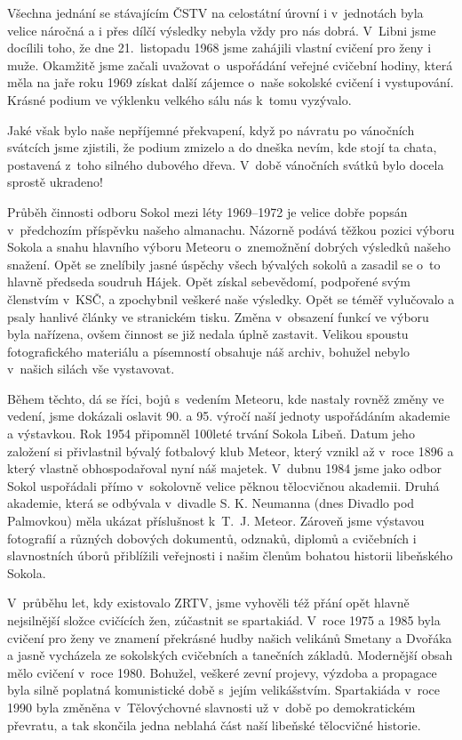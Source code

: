 \documentclass[a5paper, 11pt, twoside]{article}
\begin{document}
Všechna jednání se stávajícím ČSTV na celostátní úrovní i v~jednotách
byla velice náročná a i přes dílčí výsledky nebyla vždy pro nás dobrá.
V~Libni jsme docílili toho, že dne 21.~listopadu 1968 jsme zahájili
vlastní cvičení pro ženy i muže. Okamžitě jsme začali uvažovat
o~uspořádání veřejné cvičební hodiny, která měla na jaře roku 1969 získat
další zájemce o~naše sokolské cvičení i vystupování. Krásné podium ve
výklenku velkého sálu nás k~tomu vyzývalo.

Jaké však bylo naše nepříjemné překvapení, když po návratu po vánočních
svátcích jsme zjistili, že podium zmizelo a do dneška nevím, kde stojí
ta chata, postavená z~toho silného dubového dřeva. V~době vánočních
svátků bylo docela sprostě ukradeno!

Průběh činnosti odboru Sokol mezi léty 1969--1972 je velice
dobře popsán v~předchozím příspěvku našeho almanachu. Názorně podává
těžkou pozici výboru Sokola a snahu hlavního výboru Meteoru o~znemožnění
dobrých výsledků našeho snažení. Opět se znelíbily jasné úspěchy všech
bývalých sokolů a zasadil se o~to hlavně předseda soudruh Hájek. Opět
získal sebevědomí, podpořené svým členstvím v~KSČ, a zpochybnil veškeré
naše výsledky. Opět se téměř vylučovalo a psaly hanlivé články ve
stranickém tisku. Změna v~obsazení funkcí ve výboru byla nařízena, ovšem
činnost se již nedala úplně zastavit. Velikou spoustu fotografického
materiálu a písemností obsahuje náš archiv, bohužel nebylo v~našich
silách vše vystavovat.

Během těchto, dá se říci, bojů s~vedením Meteoru, kde nastaly rovněž
změny ve vedení, jsme dokázali oslavit 90. a 95. výročí naší jednoty
uspořádáním akademie a výstavkou. Rok 1954 připomněl 100leté trvání
Sokola Libeň. Datum jeho založení si přivlastnil bývalý fotbalový klub
Meteor, který vznikl až v~roce 1896 a který vlastně obhospodařoval nyní
náš majetek. V~dubnu 1984 jsme jako odbor Sokol uspořádali přímo
v~sokolovně velice pěknou tělocvičnou akademii. Druhá akademie, která se
odbývala v~divadle S. K. Neumanna (dnes Divadlo pod Palmovkou) měla
ukázat příslušnost k~T.~J. Meteor. Zároveň jsme výstavou fotografií a
různých dobových dokumentů, odznaků, diplomů a cvičebních i slavnostních
úborů přiblížili veřejnosti i našim členům bohatou historii libeňského
Sokola.

V~průběhu let, kdy existovalo ZRTV, jsme vyhověli též přání opět hlavně
nejsilnější složce cvičících žen, zúčastnit se spartakiád. V~roce 1975 a
1985 byla cvičení pro ženy ve znamení překrásné hudby našich velikánů
Smetany a Dvořáka a jasně vycházela ze sokolských cvičebních a tanečních
základů. Modernější obsah mělo cvičení v~roce 1980. Bohužel, veškeré
zevní projevy, výzdoba a propagace byla silně poplatná komunistické době
s~jejím velikášstvím. Spartakiáda v~roce 1990 byla změněna
v~Tělovýchovné slavnosti už v~době po demokratickém převratu, a tak
skončila jedna neblahá část naší libeňské tělocvičné historie.
\end{document}
